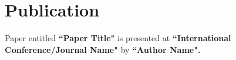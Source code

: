 \chapter*{Publication}
Paper entitled \textbf{``Paper Title"} is presented at \textbf{``International Conference/Journal Name"} by \textbf{``Author Name".}\\
